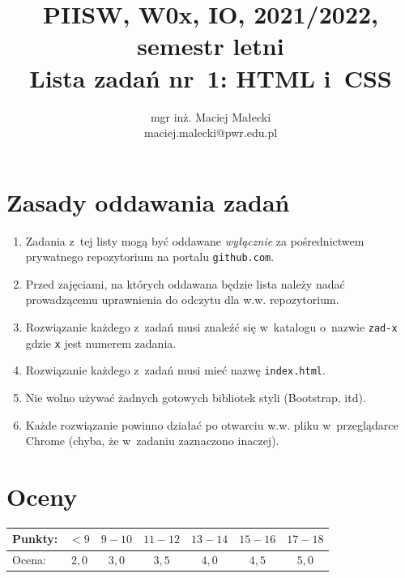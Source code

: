 \documentclass[12pt]{article}
\title{PIISW, W0x, IO, 2021/2022, semestr letni\\Lista zadań nr~1: HTML i~CSS}
\author{mgr inż. Maciej Małecki\\ \small maciej.malecki@pwr.edu.pl}
\begin{document}
    \maketitle

    \section*{Zasady oddawania zadań}
        \begin{enumerate}
            \item Zadania z~tej listy mogą być oddawane \emph{wyłącznie} za pośrednictwem prywatnego repozytorium na portalu \texttt{github.com}.
            \item Przed zajęciami, na których oddawana będzie lista należy nadać prowadzącemu uprawnienia do odczytu dla w.w. repozytorium.
            \item Rozwiązanie każdego z~zadań musi znaleźć się w~katalogu o~nazwie \texttt{zad-x} gdzie \texttt{x} jest numerem zadania.
            \item Rozwiązanie każdego z~zadań musi mieć nazwę \texttt{index.html}.
            \item Nie wolno używać żadnych gotowych bibliotek styli (Bootstrap, itd).
            \item Każde rozwiązanie powinno działać po otwarciu w.w. pliku w~przeglądarce Chrome (chyba, że w~zadaniu zaznaczono inaczej).
        \end{enumerate}

    \section*{Oceny}
    \begin{tabular}{|l|c|c|c|c|c|c|}
        \hline
        Punkty: & $<9$ & $9-10$ & $11-12$ & $13-14$ & $15-16$ & $17-18$\\
        \hline
        Ocena:  & $2,0$ & $3,0$ & $3,5$ & $4,0$ & $4,5$ & $5,0$\\
        \hline
    \end{tabular}
\end{document}
